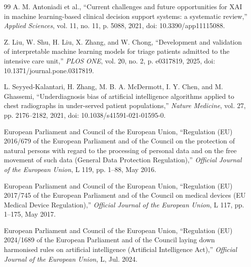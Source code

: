 \documentclass[11pt]{article}
\begin{document}
\begin{thebibliography}{99}
A. M. Antoniadi et al., ``Current challenges and future opportunities for XAI in machine learning-based clinical decision support systems: a systematic review,'' \emph{Applied Sciences}, vol. 11, no. 11, p. 5088, 2021, doi: 10.3390/app11115088.

Z. Liu, W. Shu, H. Liu, X. Zhang, and W. Chong, ``Development and validation of interpretable machine learning models for triage patients admitted to the intensive care unit,'' \emph{PLOS ONE}, vol. 20, no. 2, p. e0317819, 2025, doi: 10.1371/journal.pone.0317819.

L. Seyyed-Kalantari, H. Zhang, M. B. A. McDermott, I. Y. Chen, and M. Ghassemi, ``Underdiagnosis bias of artificial intelligence algorithms applied to chest radiographs in under-served patient populations,'' \emph{Nature Medicine}, vol. 27, pp. 2176--2182, 2021, doi: 10.1038/s41591-021-01595-0.

European Parliament and Council of the European Union, ``Regulation (EU) 2016/679 of the European Parliament and of the Council on the protection of natural persons with regard to the processing of personal data and on the free movement of such data (General Data Protection Regulation),'' \emph{Official Journal of the European Union}, L 119, pp. 1--88, May 2016.

European Parliament and Council of the European Union, ``Regulation (EU) 2017/745 of the European Parliament and of the Council on medical devices (EU Medical Device Regulation),'' \emph{Official Journal of the European Union}, L 117, pp. 1--175, May 2017.

European Parliament and Council of the European Union, ``Regulation (EU) 2024/1689 of the European Parliament and of the Council laying down harmonised rules on artificial intelligence (Artificial Intelligence Act),'' \emph{Official Journal of the European Union}, L, Jul. 2024.

\end{thebibliography}
\end{document}
